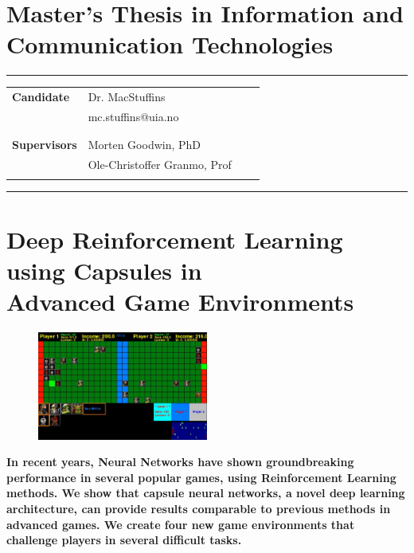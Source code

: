 \documentclass[11pt]{article} %
\newcommand{\picturefirststudent}{profile1.png}
\begin{document}
\section*{Master's Thesis in Information and Communication Technologies \the\year} %

\hrule height 1pt
\begin{table}[h]
	\footnotesize
	\begin{tabular}{p{} p{} p{} p{}}
		
		\textbf{Candidate}   & Dr. MacStuffins      &  \\
		& mc.stuffins@uia.no        &                      \\
		&                        &                      \\
		&                        &                      \\
		\textbf{Supervisors} & Morten Goodwin, PhD         &                      \\
		& Ole-Christoffer Granmo, Prof &                     \\
		& & 
	\end{tabular}
\end{table}

\hrule height 1pt

\section*{Deep Reinforcement Learning using Capsules in\\Advanced Game Environments}
\begin{figure} 
\vspace{-30pt}
  \begin{center}
    \includegraphics[width=0.5\textwidth]{./deep_line_wars.pdf}%
    \label{fig:databaseUserTable}
  \end{center}

\end{figure} 
\textbf{In recent years, Neural Networks have shown groundbreaking performance in several popular games, using Reinforcement Learning methods. We show that capsule neural networks, a novel deep learning architecture, can provide results comparable to previous methods in advanced games. We create four new game environments that challenge players in several difficult tasks.}
\\
\\
\\
\noindent
\end{document}

